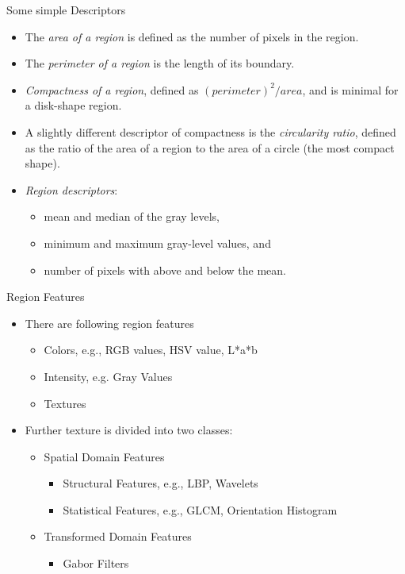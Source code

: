 \begin{frame}{Some simple Descriptors}
\begin{itemize}
\item The \textit{\color{mycolor1}area of a region} is defined as the number of 
pixels in the region.
\item The \textit{\color{mycolor1}perimeter of a region} is the length of its 
boundary.
\item \textit{\color{mycolor1}Compactness of a region}, defined as 
$(perimeter)^2/area$, and is minimal for a disk-shape 
region.
\item A slightly different descriptor of compactness is the \textit{\color{mycolor1}circularity ratio}, defined as the ratio of the area of a region to the area of a circle (the most compact shape).
\item \textit{\color{mycolor1}Region descriptors}:
\begin{itemize}
\item mean and median of the gray levels,
\item minimum and maximum gray-level values, and
\item number of pixels with above and below the mean.
\end{itemize}
\end{itemize}
\end{frame}

\begin{frame}{Region Features}
\begin{itemize}
\setlength{\itemsep}{12pt}
\item There are following region features
\begin{itemize}
\item Colors, e.g., RGB values, HSV value, L*a*b
\item Intensity, e.g. Gray Values
\item Textures
\end{itemize}
\item Further texture is divided into two classes:
\begin{itemize}
\item Spatial Domain Features
\begin{itemize}
\item Structural Features, e.g., LBP, Wavelets
\item Statistical Features, e.g., GLCM, Orientation Histogram
\end{itemize}
\item Transformed Domain Features
\begin{itemize}
\item Gabor Filters
\end{itemize}
\end{itemize}
\end{itemize}
\end{frame}

